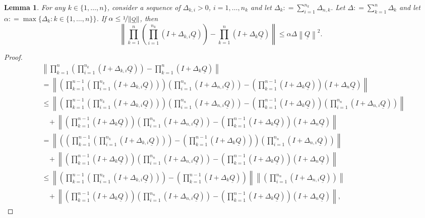\documentclass[a4paper,reqno]{amsart}
\newtheorem{lemma}[theorem]{Lemma}
\newcommand{\lrate}{\underline{Q}}
\newcommand{\norm}[1]{\left\lVert #1 \right\rVert}
\newcommand{\coloneqq}{:\!=}
\begin{document}
\begin{lemma}\label{lemma:differencebetweennested}
For any $k\in\{1,\dots,n\}$, consider a sequence of $\Delta_{k,i}>0$, $i=1,\dots,n_k$ and let $\Delta_k\coloneqq\sum_{i=1}^{n_k}\Delta_{n,k}$. Let $\Delta\coloneqq\sum_{k=1}^n\Delta_k$ and let $\alpha\coloneqq\max\{\Delta_k\colon k\in\{1,\dots,n\}\}$. If $\alpha\leq\nicefrac{1}{\norm{\lrate}}$, then
\begin{equation*}
\norm{\prod_{k=1}^n\left(\prod_{i=1}^{n_k}(I+\Delta_{k,i}\lrate)\right)
-
\prod_{k=1}^n(I+\Delta_k\lrate)
}
\leq\alpha\Delta\norm{\lrate}^2.
\end{equation*}
\end{lemma}
\begin{proof}
\begin{align*}
&\norm{\prod_{k=1}^n\left(\prod_{i=1}^{n_k}(I+\Delta_{k,i}\lrate)\right)
-
\prod_{k=1}^n(I+\Delta_k\lrate)
}\\
&=\norm{\left(\prod_{k=1}^{n-1}\left(\prod_{i=1}^{n_k}(I+\Delta_{k,i}\lrate)\right)\right)\left(\prod_{i=1}^{n_n}(I+\Delta_{n,i}\lrate)\right)
-
\left(\prod_{k=1}^{n-1}(I+\Delta_k\lrate)\right)(I+\Delta_n\lrate)
}\\
&\leq\norm{
\left(\prod_{k=1}^{n-1}\left(\prod_{i=1}^{n_k}(I+\Delta_{k,i}\lrate)\right)\right)\left(\prod_{i=1}^{n_n}(I+\Delta_{n,i}\lrate)\right)
-
\left(\prod_{k=1}^{n-1}(I+\Delta_k\lrate)\right)
\left(\prod_{i=1}^{n_n}(I+\Delta_{n,i}\lrate)\right)
}\\
&~~~~+\norm{
\left(\prod_{k=1}^{n-1}(I+\Delta_k\lrate)\right)
\left(\prod_{i=1}^{n_n}(I+\Delta_{n,i}\lrate)\right)
-
\left(\prod_{k=1}^{n-1}(I+\Delta_k\lrate)\right)(I+\Delta_n\lrate)
}\\
&=\norm{
\left(
\left(
\prod_{k=1}^{n-1}\left(\prod_{i=1}^{n_k}(I+\Delta_{k,i}\lrate)\right)
\right)
-
\left(\prod_{k=1}^{n-1}(I+\Delta_k\lrate)\right)
\right)
\left(\prod_{i=1}^{n_n}(I+\Delta_{n,i}\lrate)\right)
}\\
&~~~~+\norm{
\left(\prod_{k=1}^{n-1}(I+\Delta_k\lrate)\right)
\left(\prod_{i=1}^{n_n}(I+\Delta_{n,i}\lrate)\right)
-
\left(\prod_{k=1}^{n-1}(I+\Delta_k\lrate)\right)(I+\Delta_n\lrate)
}\\
&\leq\norm{
\left(
\prod_{k=1}^{n-1}\left(\prod_{i=1}^{n_k}(I+\Delta_{k,i}\lrate)\right)
\right)
-
\left(\prod_{k=1}^{n-1}(I+\Delta_k\lrate)\right)
}
\norm{
\left(\prod_{i=1}^{n_n}(I+\Delta_{n,i}\lrate)\right)
}\\
&~~~~+\norm{
\left(\prod_{k=1}^{n-1}(I+\Delta_k\lrate)\right)
\left(\prod_{i=1}^{n_n}(I+\Delta_{n,i}\lrate)\right)
-
\left(\prod_{k=1}^{n-1}(I+\Delta_k\lrate)\right)(I+\Delta_n\lrate)
},
\end{align*}


\end{proof}
\end{document}
